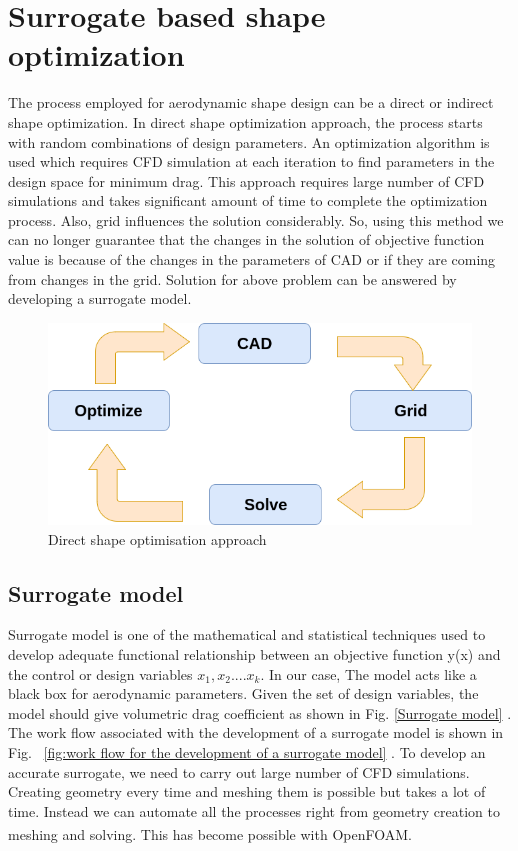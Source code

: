 \chapter{Surrogate based shape optimization}
\label{optimization}
The process employed for aerodynamic shape design can be a direct or indirect shape optimization. In direct shape optimization approach, the process starts with random combinations of design parameters. An optimization algorithm is used which requires CFD simulation at each iteration to find parameters in the design space for minimum drag. This approach requires large number of CFD simulations and takes significant amount of time to complete the optimization process. Also, grid influences the solution considerably. So, using this method we can no longer guarantee that the changes in the solution of objective function value is because of the changes in the parameters of CAD or if they are coming from changes in the grid. Solution for above problem can be answered by developing a surrogate model.
\begin{figure}[H]
	\includegraphics[width=\textwidth]{optimization/closed_loop.png}
	\caption{Direct shape optimisation approach}
	\label{Closed Optimization loop} %
\end{figure}

\section{Surrogate model}

 Surrogate model is one of the mathematical and statistical techniques used to develop adequate functional relationship between an objective function y(x) and the control or design variables $ x_1 , x_2 .... x_k $. In our case, The model acts like a black box for aerodynamic parameters. Given the set of design variables, the model should give volumetric drag coefficient as shown in Fig. \ref{Surrogate model} . The work flow associated with the development of a surrogate model is shown in Fig. ~\ref{fig:work flow for the development of a surrogate model} . To develop an accurate surrogate, we need to carry out large number of CFD simulations. Creating geometry every time and meshing them is possible but takes a lot of time. Instead we can automate all the processes right from geometry creation to meshing and solving. This has become possible with OpenFOAM\textsuperscript{\textregistered}.

